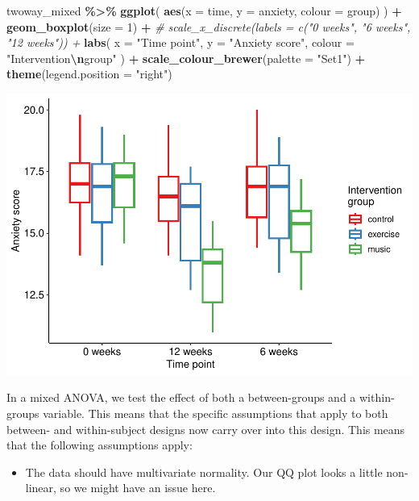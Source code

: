 \documentclass[
]{book}
\newenvironment{Shaded}{\begin{snugshade}}{\end{snugshade}}
\newcommand{\AttributeTok}[1]{\textcolor[rgb]{0.13,0.29,0.53}{#1}}
\newcommand{\CommentTok}[1]{\textcolor[rgb]{0.56,0.35,0.01}{\textit{#1}}}
\newcommand{\DecValTok}[1]{\textcolor[rgb]{0.00,0.00,0.81}{#1}}
\newcommand{\FunctionTok}[1]{\textcolor[rgb]{0.13,0.29,0.53}{\textbf{#1}}}
\newcommand{\NormalTok}[1]{#1}
\newcommand{\SpecialCharTok}[1]{\textcolor[rgb]{0.81,0.36,0.00}{\textbf{#1}}}
\newcommand{\StringTok}[1]{\textcolor[rgb]{0.31,0.60,0.02}{#1}}
\providecommand{\tightlist}{%
  \setlength{\itemsep}{0pt}\setlength{\parskip}{0pt}}
\begin{document}
\begin{Shaded}
\begin{Highlighting}[]
\NormalTok{twoway\_mixed }\SpecialCharTok{\%\textgreater{}\%}
  \FunctionTok{ggplot}\NormalTok{(}
    \FunctionTok{aes}\NormalTok{(}\AttributeTok{x =}\NormalTok{ time, }\AttributeTok{y =}\NormalTok{ anxiety, }\AttributeTok{colour =}\NormalTok{ group)}
\NormalTok{  ) }\SpecialCharTok{+} 
  \FunctionTok{geom\_boxplot}\NormalTok{(}\AttributeTok{size =} \DecValTok{1}\NormalTok{) }\SpecialCharTok{+}
  \CommentTok{\# scale\_x\_discrete(labels = c("0 weeks", "6 weeks", "12 weeks")) +}
  \FunctionTok{labs}\NormalTok{(}
    \AttributeTok{x =} \StringTok{"Time point"}\NormalTok{,}
    \AttributeTok{y =} \StringTok{"Anxiety score"}\NormalTok{,}
    \AttributeTok{colour =} \StringTok{"Intervention}\SpecialCharTok{\textbackslash{}n}\StringTok{group"}
\NormalTok{  ) }\SpecialCharTok{+}
  \FunctionTok{scale\_colour\_brewer}\NormalTok{(}\AttributeTok{palette =} \StringTok{"Set1"}\NormalTok{) }\SpecialCharTok{+}
  \FunctionTok{theme}\NormalTok{(}\AttributeTok{legend.position =} \StringTok{"right"}\NormalTok{)}
\end{Highlighting}
\end{Shaded}

\includegraphics{_main_files/figure-latex/unnamed-chunk-242-1.pdf}

In a mixed ANOVA, we test the effect of both a between-groups and a within-groups variable. This means that the specific assumptions that apply to both between- and within-subject designs now carry over into this design. This means that the following assumptions apply:

\begin{itemize}
\tightlist
\item
  The data should have multivariate normality. Our QQ plot looks a little non-linear, so we might have an issue here.
\end{itemize}
\end{document}
